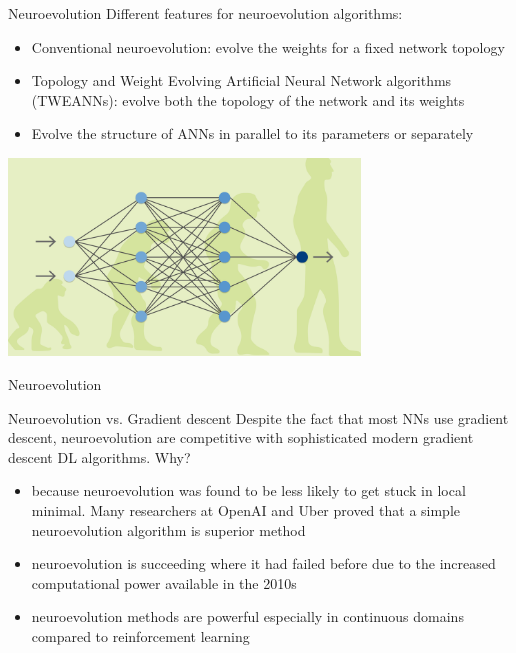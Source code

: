 \begin{frame}{Neuroevolution}
Different features for neuroevolution algorithms:
\begin{itemize}
    \item Conventional neuroevolution: evolve the weights for a fixed network topology 
    \item Topology and Weight Evolving Artificial Neural Network algorithms (TWEANNs): evolve both the topology of the network and its weights
    \item Evolve the structure of ANNs in parallel to its parameters or separately
\end{itemize}
\centering
\includegraphics[width=0.7\textwidth]{new_images/NE1.png}
\end{frame}

\begin{frame}{Neuroevolution}
\begin{block}{Neuroevolution vs. Gradient descent}
Despite the fact that most NNs use gradient descent, neuroevolution are competitive with sophisticated modern gradient descent DL algorithms. Why?
\begin{itemize}
    \item because neuroevolution was found to be less likely to get stuck in local minimal. Many researchers at OpenAI and Uber proved that a simple neuroevolution algorithm is superior method  
    \item neuroevolution is succeeding where it had failed before due to the increased computational power available in the 2010s
    \item neuroevolution methods are powerful especially in continuous domains compared to reinforcement learning
\end{itemize}
\end{block}

\end{frame}

